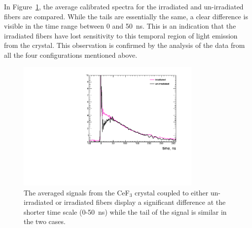 \documentclass[a4paper,11pt]{article}
\begin{document}
In Figure~\ref{fig:CeF3shapeComparison}, the average calibrated spectra for the irradiated and un-irradiated fibers are compared. While the tails are essentially the same, a clear difference is visible in the time range between 0 and 50~ns. This is an indication that the irradiated fibers have lost sensitivity to this temporal region of light emission from the crystal. This observation is confirmed by the analysis of the data from all the four configurations mentioned above.
\begin{figure}[ht]
\begin{center}
        \includegraphics[width=9cm]{Figures/CeF3coupledFibresShapeComparison.pdf}
    \caption{\small The averaged signals from the CeF$_3$ crystal coupled to either un-irradiated or irradiated fibers display a significant difference at the shorter time scale (0-50~ns) while the tail of the signal is similar in the two cases.}
    \label{fig:CeF3shapeComparison}
\end{center}
\end{figure}
\end{document}
